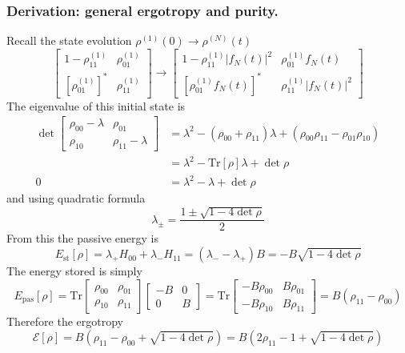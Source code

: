 \documentclass[../../../main.tex]{subfiles}
\begin{document}
\subsubsection{Derivation: general ergotropy and purity.}
Recall the state evolution $\rho^{(1)}(0) \rightarrow \rho^{(N)}(t)$
\begin{equation*}
  \begin{bmatrix}
    1 -\rho_{11}^{(1)}  & \rho_{01}^{(1)} \\
    [\rho_{01}^{(1)}]^* & \rho_{11}^{(1)}
  \end{bmatrix}
  \rightarrow
  \begin{bmatrix}
    1 -\rho_{11}^{(1)}|f_N(t)|^2 & \rho_{01}^{(1)}f_N(t)     \\
    [\rho_{01}^{(1)}f_N(t)]^*    & \rho_{11}^{(1)}|f_N(t)|^2
  \end{bmatrix}
\end{equation*}
The eigenvalue of this initial state is
\begin{align*}
  \det \begin{bmatrix}\rho_{00}-\lambda & \rho_{01}\\ \rho_{10} & \rho_{11}-\lambda\end{bmatrix} & = \lambda^2-(\rho_{00}+\rho_{11})\lambda+(\rho_{00}\rho_{11}-\rho_{01}\rho_{10}) \\
                                                                                                 & = \lambda^2 - \mathrm{Tr} [\rho]\lambda+\det \rho                                \\
  0                                                                                              & =  \lambda^2 -\lambda + \det \rho
\end{align*}
and using quadratic formula
\begin{equation*}
  \lambda_{\pm} = \frac{1 \pm \sqrt{1-4 \det \rho}}{2 }
\end{equation*}
From this the passive energy is
\begin{equation*}
  E_\mathrm{st} [\rho]= \lambda_+ H_{00} + \lambda_- H_{11}  = (\lambda_--\lambda_+)B = - B \sqrt{1-4 \det \rho}
\end{equation*}
The energy stored is simply
\begin{equation*}
  E_\mathrm{pas} [\rho]= \mathrm{Tr}  \begin{bmatrix}
    \rho_{00} & \rho_{01} \\
    \rho_{10} & \rho_{11}
  \end{bmatrix}
  \begin{bmatrix}
    -B & 0 \\
    0  & B
  \end{bmatrix}
  = \mathrm{Tr}
  \begin{bmatrix}
    -B\rho_{00}  & B\rho_{01} \\
    -B \rho_{10} & B\rho_{11}
  \end{bmatrix}
  = B(\rho_{11}-\rho_{00})
\end{equation*}
Therefore the ergotropy
\begin{equation*}
  \mathcal{E} [\rho]
  = B(\rho_{11}-\rho_{00} + \sqrt{1-4 \det \rho})
  = B(2\rho_{11}- 1 + \sqrt{1-4 \det \rho})
\end{equation*}
\end{document}
